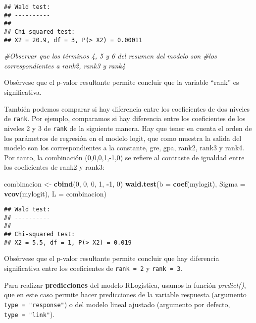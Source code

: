 \documentclass[
]{article}
\newenvironment{Shaded}{\begin{snugshade}}{\end{snugshade}}
\newcommand{\AttributeTok}[1]{\textcolor[rgb]{0.13,0.29,0.53}{#1}}
\newcommand{\CommentTok}[1]{\textcolor[rgb]{0.56,0.35,0.01}{\textit{#1}}}
\newcommand{\DecValTok}[1]{\textcolor[rgb]{0.00,0.00,0.81}{#1}}
\newcommand{\FunctionTok}[1]{\textcolor[rgb]{0.13,0.29,0.53}{\textbf{#1}}}
\newcommand{\NormalTok}[1]{#1}
\newcommand{\OtherTok}[1]{\textcolor[rgb]{0.56,0.35,0.01}{#1}}
\newcommand{\SpecialCharTok}[1]{\textcolor[rgb]{0.81,0.36,0.00}{\textbf{#1}}}
\begin{document}
\begin{verbatim}
## Wald test:
## ----------
## 
## Chi-squared test:
## X2 = 20.9, df = 3, P(> X2) = 0.00011
\end{verbatim}

\begin{Shaded}
\begin{Highlighting}[]
\CommentTok{\#Observar que los términos 4, 5 y 6 del resumen del modelo son }
\CommentTok{\#los correspondientes a rank2, rank3 y rank4}
\end{Highlighting}
\end{Shaded}

Obsérvese que el p-valor resultante permite concluir que la variable
``rank'' es significativa.

También podemos comparar si hay diferencia entre los coeficientes de dos
niveles de \texttt{rank}. Por ejemplo, comparamos si hay diferencia
entre los coeficientes de los niveles 2 y 3 de \texttt{rank} de la
siguiente manera. Hay que tener en cuenta el orden de los parámetros de
regresión en el modelo logit, que como muestra la salida del modelo son
los correspondientes a la constante, gre, gpa, rank2, rank3 y rank4. Por
tanto, la combinación (0,0,0,1,-1,0) se refiere al contraste de igualdad
entre los coeficientes de rank2 y rank3:

\begin{Shaded}
\begin{Highlighting}[]
\NormalTok{combinacion }\OtherTok{\textless{}{-}} \FunctionTok{cbind}\NormalTok{(}\DecValTok{0}\NormalTok{, }\DecValTok{0}\NormalTok{, }\DecValTok{0}\NormalTok{, }\DecValTok{1}\NormalTok{, }\SpecialCharTok{{-}}\DecValTok{1}\NormalTok{, }\DecValTok{0}\NormalTok{)}
\FunctionTok{wald.test}\NormalTok{(}\AttributeTok{b =} \FunctionTok{coef}\NormalTok{(mylogit), }\AttributeTok{Sigma =} \FunctionTok{vcov}\NormalTok{(mylogit), }\AttributeTok{L =}\NormalTok{ combinacion)}
\end{Highlighting}
\end{Shaded}

\begin{verbatim}
## Wald test:
## ----------
## 
## Chi-squared test:
## X2 = 5.5, df = 1, P(> X2) = 0.019
\end{verbatim}

Obsérvese que el p-valor resultante permite concluir que hay diferencia
significativa entre los coeficientes de \texttt{rank\ =\ 2} y
\texttt{rank\ =\ 3}.

Para realizar \textbf{predicciones} del modelo RLogistica, usamos la
función \emph{predict()}, que en este caso permite hacer predicciones de
la variable respuesta (argumento \texttt{type\ =\ "response"}) o del
modelo lineal ajustado (argumento por defecto,
\texttt{type\ =\ "link"}).
\end{document}
